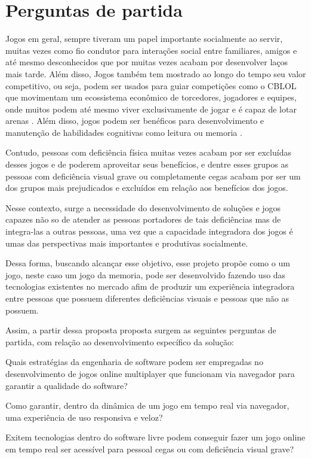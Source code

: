 \chapter{Perguntas de partida}

\label{chap:Perguntas de partida}

Jogos em geral, sempre tiveram um papel importante socialmente ao servir, muitas vezes como fio condutor para interações social entre familiares, amigos e até mesmo desconhecidos que por muitas vezes acabam por desenvolver laços mais tarde. Além disso, Jogos também tem mostrado ao longo do tempo seu valor competitivo, ou seja, podem ser usados para guiar competições como o CBLOL que movimentam um ecossistema econômico de torcedores, jogadores e equipes, onde muitos podem até mesmo viver exclusivamente de jogar e é capaz de lotar arenas \cite{FinalCBL40:online}. Além disso, jogos podem ser benéficos para desenvolvimento e manutenção de habilidades cognitivas como leitura \cite{Enhancingreading} ou memoria \cite{videogameimproveshigh-fidelitymemory}.

Contudo, pessoas com deficiência física muitas vezes acabam por ser excluídas desses jogos e de poderem aproveitar seus benefícios, e dentre esses grupos as pessoas com deficiência visual grave ou completamente cegas acabam por ser um dos grupos mais prejudicados e excluídos em relação aos benefícios dos jogos.

Nesse contexto, surge a necessidade do desenvolvimento de soluções e jogos capazes não so de atender as pessoas portadores de tais deficiências mas de integra-las a outras pessoas, uma vez que a capacidade integradora dos jogos é umas das perspectivas mais importantes e produtivas socialmente. 

Dessa forma, buscando alcançar esse objetivo, esse projeto propõe como o um jogo, neste caso um jogo da memoria, pode ser desenvolvido fazendo uso das tecnologias existentes no mercado afim de produzir um experiência integradora entre pessoas que possuem diferentes deficiências visuais e pessoas que não as possuem. 

Assim, a partir dessa proposta proposta surgem as seguintes perguntas de partida, com relação ao desenvolvimento específico da solução:

\begin{questao}
  \item Quais estratégias da engenharia de software podem ser empregadas no desenvolvimento de jogos online multiplayer que funcionam via navegador para garantir a qualidade do software?
  \item Como garantir, dentro da dinâmica de um jogo em tempo real via navegador, uma experiência de uso responsiva e veloz?
  \item Exitem tecnologias dentro do software livre podem conseguir fazer um jogo online em tempo real ser acessível para pessoal cegas ou com deficiência visual grave?
\end{questao}
